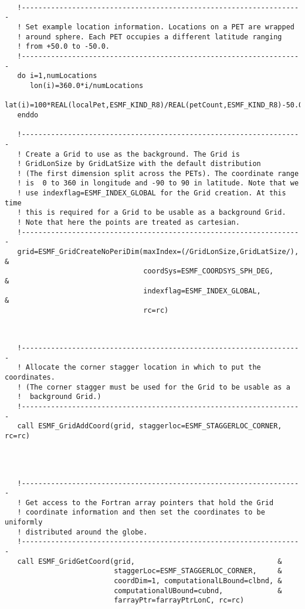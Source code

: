  \begin{verbatim}

   !-------------------------------------------------------------------
   ! Set example location information. Locations on a PET are wrapped 
   ! around sphere. Each PET occupies a different latitude ranging 
   ! from +50.0 to -50.0.
   !-------------------------------------------------------------------
   do i=1,numLocations
      lon(i)=360.0*i/numLocations
      lat(i)=100*REAL(localPet,ESMF_KIND_R8)/REAL(petCount,ESMF_KIND_R8)-50.0
   enddo

   !-------------------------------------------------------------------
   ! Create a Grid to use as the background. The Grid is 
   ! GridLonSize by GridLatSize with the default distribution 
   ! (The first dimension split across the PETs). The coordinate range
   ! is  0 to 360 in longitude and -90 to 90 in latitude. Note that we 
   ! use indexflag=ESMF_INDEX_GLOBAL for the Grid creation. At this time 
   ! this is required for a Grid to be usable as a background Grid.
   ! Note that here the points are treated as cartesian.
   !-------------------------------------------------------------------
   grid=ESMF_GridCreateNoPeriDim(maxIndex=(/GridLonSize,GridLatSize/), &
                                 coordSys=ESMF_COORDSYS_SPH_DEG,       &
                                 indexflag=ESMF_INDEX_GLOBAL,          &
                                 rc=rc)
 
\end{verbatim}
 

 \begin{verbatim}

   !-------------------------------------------------------------------
   ! Allocate the corner stagger location in which to put the coordinates. 
   ! (The corner stagger must be used for the Grid to be usable as a
   !  background Grid.)
   !-------------------------------------------------------------------
   call ESMF_GridAddCoord(grid, staggerloc=ESMF_STAGGERLOC_CORNER, rc=rc)

 
\end{verbatim}
 

 \begin{verbatim}

   !-------------------------------------------------------------------
   ! Get access to the Fortran array pointers that hold the Grid 
   ! coordinate information and then set the coordinates to be uniformly 
   ! distributed around the globe. 
   !-------------------------------------------------------------------
   call ESMF_GridGetCoord(grid,                                  &
                          staggerLoc=ESMF_STAGGERLOC_CORNER,     &
                          coordDim=1, computationalLBound=clbnd, &
                          computationalUBound=cubnd,             & 
                          farrayPtr=farrayPtrLonC, rc=rc)
 
\end{verbatim}
 
